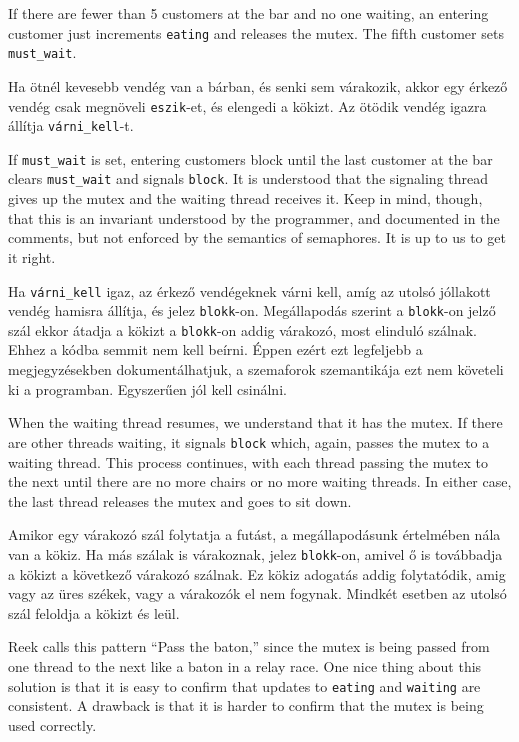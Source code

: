 \documentclass{book}
\begin{document}
If there are fewer than 5 customers at the bar and no one waiting, an
entering customer just increments {\tt eating} and releases the
mutex.  The fifth customer sets {\tt must\_wait}.

Ha ötnél kevesebb vendég van a bárban, és senki sem várakozik,
akkor egy érkező vendég csak megnöveli {\tt eszik}-et, és
elengedi a kökizt. Az ötödik vendég igazra állítja {\tt várni\_kell}-t.

If {\tt must\_wait} is set, entering customers block until the last
customer at the bar clears {\tt must\_wait} and signals {\tt block}.
It is understood that the signaling thread gives up the mutex and the
waiting thread receives it.  Keep in mind, though, that this is an
invariant understood by the programmer, and documented in the
comments, but not enforced by the semantics of semaphores.  It is up
to us to get it right.

Ha {\tt várni\_kell} igaz, az érkező vendégeknek várni kell, amíg
az utolsó jóllakott vendég hamisra állítja, és jelez {\tt blokk}-on.
Megállapodás szerint a {\tt blokk}-on jelző szál ekkor átadja a kökizt
a {\tt blokk}-on addig várakozó, most elinduló szálnak. Ehhez a
kódba semmit nem kell beírni. Éppen ezért ezt legfeljebb a
megjegyzésekben dokumentálhatjuk, a szemaforok szemantikája ezt nem
követeli ki a programban. Egyszerűen jól kell csinálni.

When the waiting thread resumes, we understand that it has
the mutex.  If there are other threads waiting,
it signals {\tt block} which, again,
passes the mutex to a waiting thread.  This process
continues, with each thread passing the mutex to the next until
there are no more chairs or no more waiting threads.  In either
case, the last thread releases the mutex and goes to sit down.

Amikor egy várakozó szál folytatja a futást, a megállapodásunk
értelmében nála van a kökiz. Ha más szálak is várakoznak,
jelez {\tt blokk}-on, amivel ő is továbbadja a kökizt a
következő várakozó szálnak. Ez kökiz adogatás addig
folytatódik, amig vagy az üres székek, vagy a várakozók
el nem fogynak. Mindkét esetben az utolsó szál feloldja
a kökizt és leül.

Reek calls this pattern ``Pass the baton,'' since the mutex
is being passed from one thread to the next like a baton in a
relay race.
One nice thing about this solution is that it is easy to confirm
that updates to {\tt eating} and {\tt waiting} are consistent.
A drawback is that it is harder to confirm that the mutex is
being used correctly.
\end{document}
